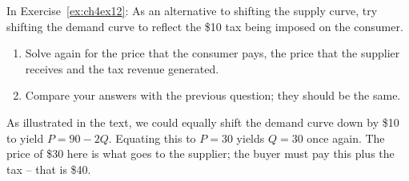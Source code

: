 \begin{enumialphparenastyle}
\begin{ex}\label{ex:ch4ex13}
In Exercise~\ref{ex:ch4ex12}: As an alternative to shifting the supply curve, try shifting the demand curve to reflect the \$10 tax being imposed on the consumer.
\begin{enumerate}
	\item	Solve again for the price that the consumer pays, the price that the supplier receives and the tax revenue generated.
	\item	Compare your answers with the previous question; they should be the same.
\end{enumerate}
\begin{sol}
	As illustrated in the text, we could equally shift the demand curve down by \$10 to yield $P=90-2Q$. Equating this to $P=30$ yields $Q=30$ once again. The price of \$30 here is what goes to the supplier; the buyer must pay this plus the tax -- that is \$40.
	
\end{sol}
\end{ex}


\end{enumialphparenastyle}
